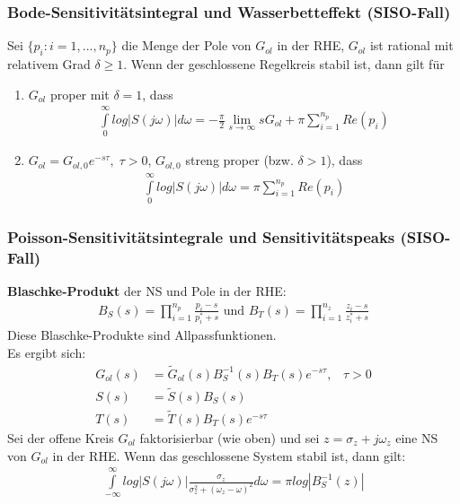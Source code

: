 \documentclass[a4paper,twocolumn,10pt]{article}
\begin{document}
\subsubsection{Bode-Sensitivitätsintegral und Wasserbetteffekt (SISO-Fall)}
Sei $\{p_i:i=1,...,n_p\}$ die Menge der Pole von $G_{ol}$ in der RHE, $G_{ol}$ ist rational mit relativem Grad $\delta\geq 1$. Wenn der geschlossene Regelkreis stabil ist, dann gilt für
\begin{enumerate}[label=$\bullet$]
\item $G_{ol}$ proper mit $\delta=1$, dass
\begin{align*}
\int\limits_0^{\infty}log|S(j\omega)|d\omega=-\frac{\pi}{2}\lim\limits_{s\rightarrow\infty}sG_{ol}+\pi\sum\limits_{i=1}^{n_p}Re(p_i)
\end{align*}
\item $G_{ol}=G_{ol,0}e^{-s\tau},\;\tau>0$, $G_{ol,0}$ streng proper (bzw. $\delta>1$), dass
\begin{align*}
\int\limits_0^{\infty}log|S(j\omega)|d\omega=\pi\sum\limits_{i=1}^{n_p}Re(p_i)
\end{align*}
\end{enumerate}

\subsubsection{Poisson-Sensitivitätsintegrale und Sensitivitätspeaks (SISO-Fall)}
\textbf{Blaschke-Produkt} der NS und Pole in der RHE:
\begin{align*}
B_S(s)=\prod\limits_{i=1}^{n_p}\frac{p_i-s}{p_i^*+s}\text{ und }B_T(s)=\prod\limits_{i=1}^{n_z}\frac{z_i-s}{z_i^*+s}
\end{align*}
Diese Blaschke-Produkte sind Allpassfunktionen.\\
Es ergibt sich:
\begin{align*}
G_{ol}(s)&=\tilde{G}_{ol}(s)B_S^{-1}(s)B_T(s)e^{-s\tau},\;\;\;\tau >0\\
S(s)&=\tilde{S}(s)B_S(s)\\
T(s)&=\tilde{T}(s)B_T(s)e^{-s\tau}
\end{align*}
Sei der offene Kreis $G_{ol}$ faktorisierbar (wie oben) und sei $z=\sigma_z+j\omega_z$ eine NS von $G_{ol}$ in der RHE. Wenn das geschlossene System stabil ist, dann gilt:
\begin{align*}
\int\limits_{-\infty}^{\infty}log|S(j\omega)|\frac{\sigma_z}{\sigma_z^2+(\omega_z-\omega)^2}d\omega=\pi log|B_S^{-1}(z)|
\end{align*}
\end{document}
